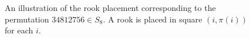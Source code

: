 \begin{figure}[h]
  \center
  \caption[A permutation corresponding to a rook placement.]{
    An illustration of the rook placement corresponding to the permutation
    $34812756 \in S_8$. A rook is placed in square $(i, \pi(i))$ for each $i$.
  }
  \label{fig:permutationFromRooks}
\end{figure}
